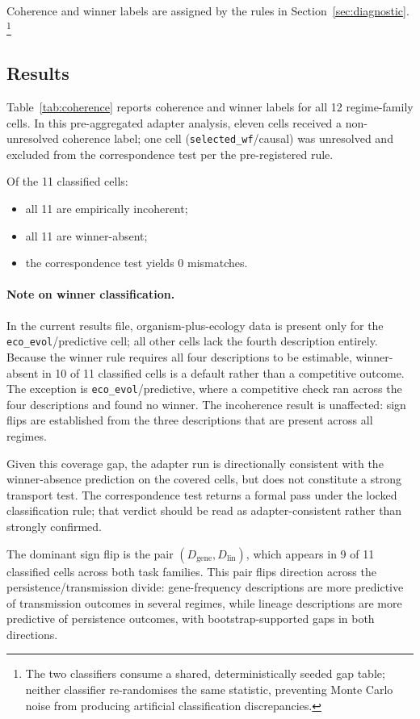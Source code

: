\documentclass[11pt]{article}
\begin{document}
Coherence and winner labels are assigned by the rules in
Section~\ref{sec:diagnostic}.%
\footnote{The two classifiers consume a shared, deterministically seeded
gap table; neither classifier re-randomises the same statistic, preventing
Monte Carlo noise from producing artificial classification discrepancies.}

\subsection{Results}

Table~\ref{tab:coherence} reports coherence and winner labels for all
12 regime-family cells.
In this pre-aggregated adapter analysis,
eleven cells received a non-unresolved coherence label;
one cell (\texttt{selected\_wf}/causal) was unresolved and
excluded from the correspondence test per the pre-registered rule.

Of the 11 classified cells:
\begin{itemize}
    \item all 11 are empirically incoherent;
    \item all 11 are winner-absent;
    \item the correspondence test yields 0 mismatches.
\end{itemize}

\paragraph{Note on winner classification.}
In the current results file, organism-plus-ecology data is present only
for the \texttt{eco\_evol}/predictive cell; all other cells lack the
fourth description entirely.
Because the winner rule requires all four descriptions to be estimable,
winner-absent in 10 of 11 classified cells is a default rather than a
competitive outcome.
The exception is \texttt{eco\_evol}/predictive, where a competitive
check ran across the four descriptions and found no winner.
The incoherence result is unaffected: sign flips are established
from the three descriptions that are present across all regimes.

Given this coverage gap, the adapter run is directionally consistent
with the winner-absence prediction on the covered cells, but does not
constitute a strong transport test.
The correspondence test returns a formal pass under the locked
classification rule; that verdict should be read as
adapter-consistent rather than strongly confirmed.

The dominant sign flip is the pair $(D_\mathrm{gene}, D_\mathrm{lin})$,
which appears in 9 of 11 classified cells across both task families.
This pair flips direction across the persistence/transmission divide:
gene-frequency descriptions are more predictive of transmission outcomes
in several regimes, while lineage descriptions are more predictive of
persistence outcomes, with bootstrap-supported gaps in both directions.
\end{document}
